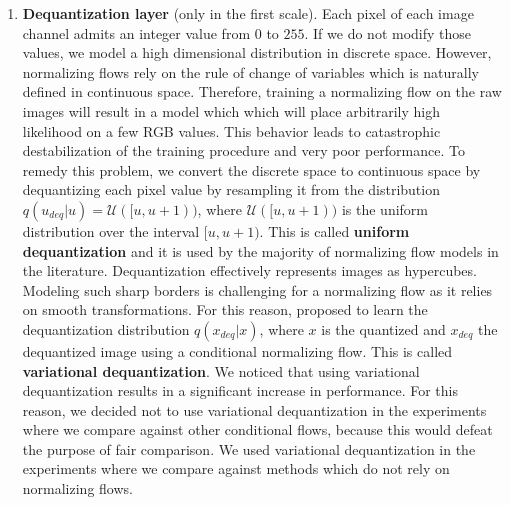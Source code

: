 \begin{enumerate}
    \item \textbf{Dequantization layer} (only in the first scale). Each pixel of each image channel admits an integer value from $0$ to $255$. If we do not modify those values, we model a high dimensional distribution in discrete space. However, normalizing flows rely on the rule of change of variables which is naturally defined in continuous space. Therefore, training a normalizing flow on the raw images will result in a model which which will place arbitrarily high likelihood on a few RGB values. This behavior leads to catastrophic destabilization of the training procedure and very poor performance. To remedy this problem, we convert the discrete space to continuous space by dequantizing each pixel value by resampling it from the distribution $q(u_{deq}|u)=\mathcal{U}([u,u+1))$, where $\mathcal{U}([u,u+1))$ is the uniform distribution over the interval $[u,u+1)$. This is called \textbf{uniform dequantization} and it is used by the majority of normalizing flow models in the literature. Dequantization effectively represents images as hypercubes. Modeling such sharp borders is challenging for a normalizing flow as it relies on smooth transformations. For this reason, \cite{ho2019flow++} proposed to learn the dequantization distribution $q(x_{deq}|x)$, where $x$ is the quantized and $x_{deq}$ the dequantized image using a conditional normalizing flow. This is called \textbf{variational dequantization}. We noticed that using variational dequantization results in a significant increase in performance. For this reason, we decided not to use variational dequantization in the experiments where we compare against other conditional flows, because this would defeat the purpose of fair comparison. We used variational dequantization in the experiments where we compare against methods which do not rely on normalizing flows.
    

\end{enumerate}
